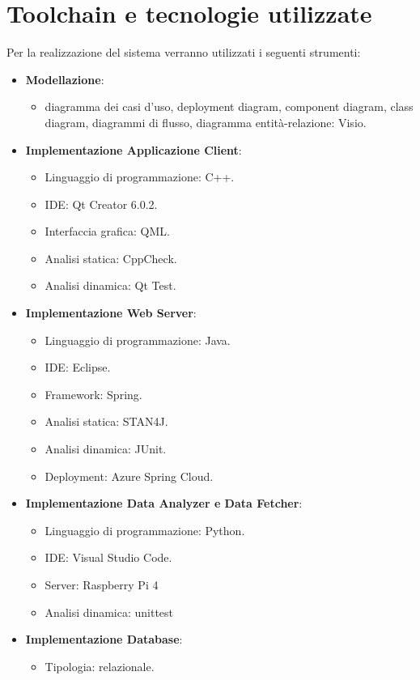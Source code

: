 \section{Toolchain e tecnologie utilizzate}
Per la realizzazione del sistema verranno utilizzati i seguenti strumenti:
\begin{itemize}
	\item \textbf{Modellazione}:
	\begin{itemize}
		\item diagramma dei casi d'uso, deployment diagram, component diagram, class
		diagram, diagrammi di flusso, diagramma entità-relazione: Visio.
	\end{itemize}
	\item \textbf{Implementazione Applicazione Client}:
	\begin{itemize}
		\item Linguaggio di programmazione: C++.
		\item IDE: Qt Creator 6.0.2.
		\item Interfaccia grafica: QML.
		\item Analisi statica: CppCheck.
		\item Analisi dinamica: Qt Test.
	\end{itemize}
	\item \textbf{Implementazione Web Server}:
	\begin{itemize}
		\item Linguaggio di programmazione: Java.
		\item IDE: Eclipse.
		\item Framework: Spring.
		\item Analisi statica: STAN4J.
		\item Analisi dinamica: JUnit.
		\item Deployment: Azure Spring Cloud.
	\end{itemize}
	\item \textbf{Implementazione Data Analyzer e Data Fetcher}:
	\begin{itemize}
		\item Linguaggio di programmazione: Python.
		\item IDE: Visual Studio Code.
		\item Server: Raspberry Pi 4
		\item Analisi dinamica: unittest
	\end{itemize}
	\item \textbf{Implementazione Database}:
	\begin{itemize}
		\item Tipologia: relazionale.

\end{itemize}
\end{itemize}

